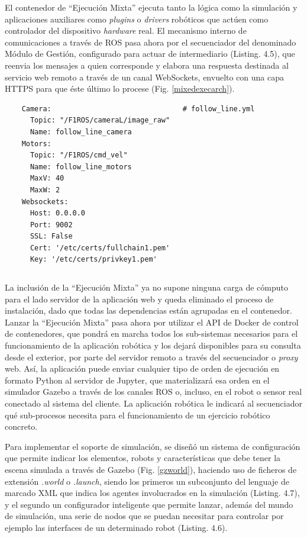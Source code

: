El contenedor de ``Ejecución Mixta'' ejecuta tanto la lógica como la simulación y aplicaciones auxiliares como \textit{plugins} o \textit{drivers} robóticos que actúen como controlador del dispositivo \textit{hardware} real. El mecanismo interno de comunicaciones a través de ROS pasa ahora por el secuenciador del denominado Módulo de Gestión, configurado para actuar de intermediario (Listing. 4.5), que reenvia los mensajes a quien corresponde y elabora una respuesta destinada al servicio web remoto a través de un canal WebSockets, envuelto con una capa HTTPS para que éste último lo procese (Fig. \ref{mixedexecarch}).
\begin{verbatim}
    Camera:                               # follow_line.yml
      Topic: "/F1ROS/cameraL/image_raw" 
      Name: follow_line_camera
    Motors:
      Topic: "/F1ROS/cmd_vel"
      Name: follow_line_motors
      MaxV: 40
      MaxW: 2
    Websockets:
      Host: 0.0.0.0 
      Port: 9002
      SSL: False
      Cert: '/etc/certs/fullchain1.pem' 
      Key: '/etc/certs/privkey1.pem'
\end{verbatim}
\begin{lstlisting}[caption=Configuración de Canales Inernos del Secuenciador en formato YAML]
\end{lstlisting}

La inclusión de la ``Ejecución Mixta'' ya no supone ninguna carga de cómputo para el lado servidor de la aplicación web y queda eliminado el proceso de instalación, dado que todas las dependencias están agrupadas en el contenedor. Lanzar la ``Ejecución Mixta'' pasa ahora por utilizar el API de Docker de control de contenedores, que pondrá en marcha todos los sub-sistemas necesarios para el funcionamiento de la aplicación robótica y los dejará disponibles para su consulta desde el exterior, por parte del servidor remoto a través del secuenciador o \textit{proxy} web. Así, la aplicación puede enviar cualquier tipo de orden de ejecución en formato Python al servidor de Jupyter, que materializará esa orden en el simulador Gazebo a través de los canales ROS o, incluso, en el robot o sensor real conectado al sistema del cliente. La aplicación robótica le indicará al secuenciador qué sub-procesos necesita para el funcionamiento de un ejercicio robótico concreto.

Para implementar el soporte de simulación, se diseñó un sistema de configuración que permite indicar los elementos, robots y características que debe tener la escena simulada a través de Gazebo (Fig. \ref{gzworld}), haciendo uso de ficheros de extensión \textit{.world} o \textit{.launch}, siendo los primeros un subconjunto del lenguaje de marcado XML que indica los agentes involucrados en la simulación (Listing. 4.7), y el segundo un configurador inteligente que permite lanzar, además del mundo de simulación, una serie de nodos que se puedan necesitar para controlar por ejemplo las interfaces de un determinado robot (Listing. 4.6). 

